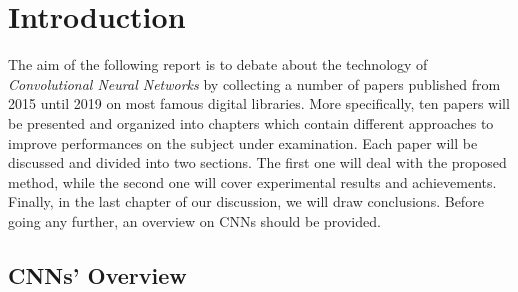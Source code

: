 \chapter{Introduction}

The aim of the following report is to debate about the technology of \textit{Convolutional Neural Networks} by collecting a number of papers published from 2015 until 2019 on most famous digital libraries. More specifically, ten papers will be presented and organized into chapters which contain different approaches to improve performances on the subject under examination. Each paper will be discussed and divided into two sections. The first one will deal with the proposed method, while the second one will cover experimental results and achievements. Finally, in the last chapter of our discussion, we will draw conclusions. Before going any further, an overview on CNNs should be provided.

\section{CNNs' Overview}

